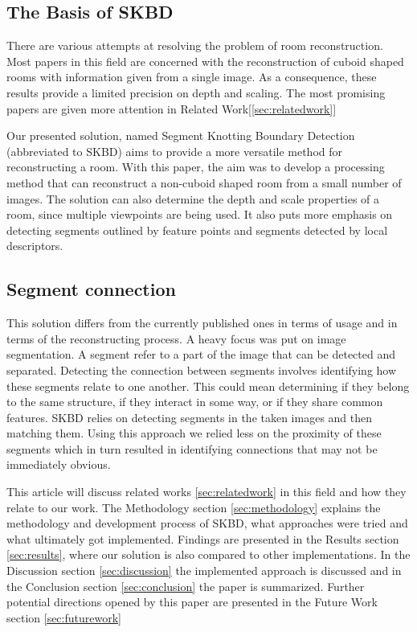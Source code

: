 \subsection{The Basis of SKBD} %
There are various attempts at resolving the problem of room reconstruction. Most papers in this field are concerned with the reconstruction of cuboid shaped rooms with information given from a single image. As a consequence, these results provide a limited precision on depth and scaling. The most promising papers are given more attention in Related Work[\ref{sec:relatedwork}]

Our presented solution, named Segment Knotting Boundary Detection (abbreviated to SKBD) aims to provide a more versatile method for reconstructing a room. With this paper, the aim was to develop a processing method that can reconstruct a non-cuboid shaped room from a small number of images. The solution can also determine the depth and scale properties of a room, since multiple viewpoints are being used. It also puts more emphasis on detecting segments outlined by feature points and segments detected by local descriptors. 

\subsection{Segment connection} %
This solution differs from the currently published ones in terms of usage and in terms of the reconstructing process. A heavy focus was put on image segmentation. A segment refer to a part of the image that can be detected and separated. Detecting the connection between segments involves identifying how these segments relate to one another. This could mean determining if they belong to the same structure, if they interact in some way, or if they share common features. SKBD relies on detecting segments in the taken images and then matching them. Using this approach we relied less on the proximity of these segments which in turn resulted in identifying connections that may not be immediately obvious.

This article will discuss related works \ref{sec:relatedwork} in this field and how they relate to our work.  The Methodology section \ref{sec:methodology} explains the methodology and development process of SKBD, what approaches were tried and what ultimately got implemented.
    Findings are presented in the Results section \ref{sec:results}, where our solution is also compared to other implementations. In the Discussion section \ref{sec:discussion} the implemented approach is discussed and in the Conclusion section \ref{sec:conclusion} the paper is summarized. Further potential directions opened by this paper are presented in the Future Work section \ref{sec:futurework}
